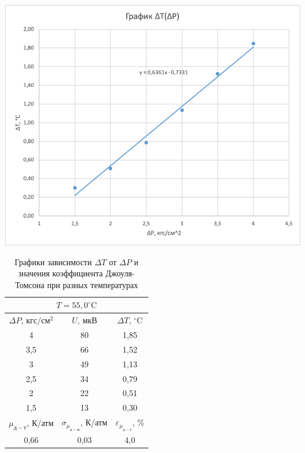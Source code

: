 \documentclass[a4paper, 12pt]{article}
\begin{document}
\begin{table}[pt]
        \vspace{0.5cm}
        
        \begin{minipage}[ht]{0.55\linewidth}
            \includegraphics[width=\linewidth]{images/ch8.png}
        \end{minipage}
        \hfill
        \begin{minipage}[ht]{0.47\linewidth}
            \begin{tabular}{|c|c|c|}
                \hline
                \multicolumn{3}{|c|}{$T = 55,0^{\circ}\text{C}$} \\
                \hline
                $\Delta P$, $кгс/см^2$ & $U$, $мкВ$ & $\Delta T$, $^{\circ}\text{C}$ \\
                \hline
                4 & 80 & 1,85 \\
                \hline
                3,5 & 66 & 1,52 \\
                \hline
                3 & 49 & 1,13 \\
                \hline
                2,5 & 34 & 0,79 \\
                \hline
                2 & 22 & 0,51 \\
                \hline
                1,5 & 13 & 0,30 \\
                \hline
                $\mu_{д-т}$, К/атм & $\sigma_{\mu_{д-м}}$, К/атм & $\varepsilon_{\mu_{д-т}}$, \% \\
                \hline
                0,66 & 0,03 & 4,0 \\
                \hline
            \end{tabular}
        \end{minipage}
        
        \caption{Графики зависимости $\Delta T$ от $\Delta P$ и значения коэффициента Джоуля-Томсона при разных температурах}
        \label{table1}
        
    \end{table}
    
\end{document}
